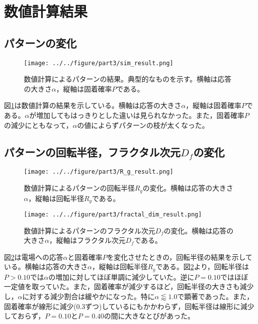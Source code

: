 \documentclass[autodetect-engine,dvi=dvipdfmx,a4paper,ja=standard,oneside,openany,11pt,draft]{bxjsbook}
\begin{document}
\section{数値計算結果}
\subsection{パターンの変化}

\begin{figure}[htbp]
  \centering
  \texttt{[image: ../../figure/part3/sim\_result.png]}
  \caption{数値計算によるパターンの結果。典型的なものを示す。横軸は応答の大きさ$\alpha$，縦軸は固着確率$P$である。}
  \label{fig:sim_result}
\end{figure}

図\ref{fig:sim_result}は数値計算の結果を示している。横軸は応答の大きさ$\alpha$，縦軸は固着確率$P$である。$\alpha$が増加してもはっきりとした違いは見られなかった。また，固着確率$P$の減少にともなって，$\alpha$の値によらずパターンの枝が太くなった。
\subsection{パターンの回転半径，フラクタル次元$D_f$の変化}

\begin{figure}[htbp]
  \centering
  \texttt{[image: ../../figure/part3/R\_g\_result.png]}
  \caption{数値計算によるパターンの回転半径$R_g$の変化。横軸は応答の大きさ$\alpha$，縦軸は回転半径$R_g$である。}
  \label{fig:R_g_result}
\end{figure}

\begin{figure}
  \centering
  \texttt{[image: ../../figure/part3/fractal\_dim\_result.png]}
  \caption{数値計算によるパターンのフラクタル次元$D_f$の変化。横軸は応答の大きさ$\alpha$，縦軸はフラクタル次元$D_f$である。}
  \label{fig:fractal_dim_result}
\end{figure}

図\ref{fig:R_g_result}は電場への応答$\alpha$と固着確率$P$を変化させたときの，回転半径の結果を示している。横軸は応答の大きさ$\alpha$，縦軸は回転半径$R_g$である。図\ref{fig:R_g_result}より，回転半径は$P>0.10$では$\alpha$の増加に対してほぼ単調に減少していた。逆に$P=0.10$ではほぼ一定値を取っていた。また，固着確率が減少するほど，回転半径の大きさも減少し，$\alpha$に対する減少割合は緩やかになった。特に$\alpha\lessapprox1.0$で顕著であった。また，固着確率が線形に減少(0.3ずつ)しているにもかかわらず，回転半径は線形に減少しておらず，$P=0.10$と$P=0.40$の間に大きなとびがあった。
\end{document}
